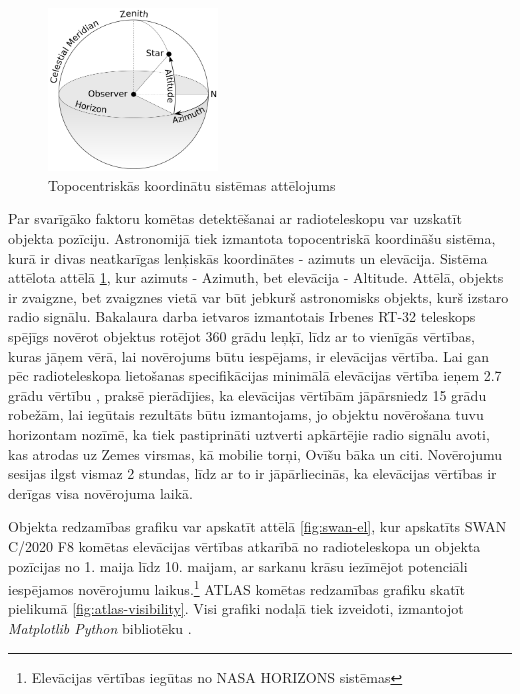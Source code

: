 \begin{figure}
    \centering
    \includegraphics[width=0.4\textwidth]{images/internet/az-el.png}
    \caption{Topocentriskās koordinātu sistēmas attēlojums \cite{az-el-img}}
      \label{fig:az-el}
\end{figure}
 Par svarīgāko faktoru komētas detektēšanai ar radioteleskopu var uzskatīt objekta pozīciju. Astronomijā tiek izmantota topocentriskā koordināšu sistēma, kurā ir divas neatkarīgas lenķiskās koordinātes - azimuts un elevācija. Sistēma attēlota attēlā \ref{fig:az-el}, kur azimuts - Azimuth, bet elevācija - Altitude. Attēlā, objekts ir zvaigzne, bet zvaigznes vietā var būt jebkurš astronomisks objekts, kurš izstaro radio signālu. Bakalaura darba ietvaros izmantotais Irbenes RT-32 teleskops spējīgs novērot objektus rotējot 360 grādu leņķī, līdz ar to vienīgās vērtības, kuras jāņem vērā, lai novērojums būtu iespējams, ir elevācijas vērtība. Lai gan pēc radioteleskopa lietošanas specifikācijas minimālā elevācijas vērtība ieņem 2.7 grādu vērtību \cite{telescope-spec}, praksē pierādījies, ka elevācijas vērtībām jāpārsniedz 15 grādu robežām, lai iegūtais rezultāts būtu izmantojams, jo objektu novērošana tuvu horizontam nozīmē, ka tiek pastiprināti uztverti apkārtējie radio signālu avoti, kas atrodas uz Zemes virsmas, kā mobilie torņi, Ovīšu bāka un citi. Novērojumu sesijas ilgst vismaz 2 stundas, līdz ar to ir jāpārliecinās, ka elevācijas vērtības ir derīgas visa novērojuma laikā. 
 
 Objekta redzamības grafiku var apskatīt attēlā \ref{fig:swan-el}, kur apskatīts SWAN C/2020 F8 komētas elevācijas vērtības atkarībā no radioteleskopa un objekta pozīcijas no 1. maija līdz 10. maijam, ar sarkanu krāsu iezīmējot potenciāli iespējamos novērojumu laikus.\footnote{Elevācijas vērtības iegūtas no NASA HORIZONS sistēmas} ATLAS komētas redzamības grafiku skatīt pielikumā \ref{fig:atlas-visibility}. Visi grafiki nodaļā tiek izveidoti, izmantojot \textit{Matplotlib Python} bibliotēku \cite{matplotlib}. 

